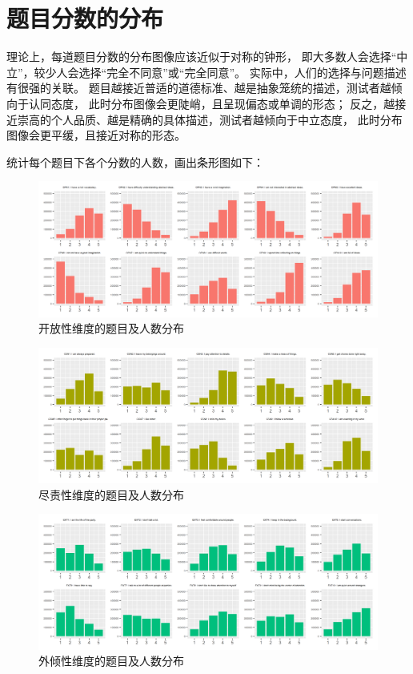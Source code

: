 \documentclass[UTF8]{ctexart}
\begin{document}
\section{题目分数的分布}
理论上，每道题目分数的分布图像应该近似于对称的钟形，
即大多数人会选择“中立”，较少人会选择“完全不同意”或“完全同意”。
实际中，人们的选择与问题描述有很强的关联。
题目越接近普适的道德标准、越是抽象笼统的描述，测试者越倾向于认同态度，
此时分布图像会更陡峭，且呈现偏态或单调的形态；
反之，越接近崇高的个人品质、越是精确的具体描述，测试者越倾向于中立态度，
此时分布图像会更平缓，且接近对称的形态。\par
统计每个题目下各个分数的人数，画出条形图如下：
\begin{figure}[H]
  \centering
  \includegraphics[scale=0.478]{OPN.png}
  \caption{开放性维度的题目及人数分布}
\end{figure}
\begin{figure}[H]
  \centering
  \includegraphics[scale=0.478]{CSN.png}
  \caption{尽责性维度的题目及人数分布}
\end{figure}
\begin{figure}[H]
  \centering
  \includegraphics[scale=0.478]{EXT.png}
  \caption{外倾性维度的题目及人数分布}
\end{figure}
\end{document}
